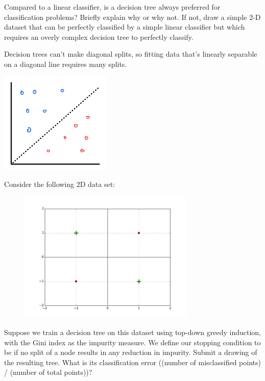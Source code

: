 \problem[4]
Compared to a linear classifier, is a decision tree always preferred for classification problems? Briefly explain why or why not. If not, draw a simple 2-D dataset that can be perfectly classified by a simple linear classifier but which requires an overly complex decision tree to perfectly classify.

\begin{solution}
    Decision trees can't make diagonal splits, so fitting data that's linearly separable on a diagonal line requires many splits.

    \includegraphics[width=0.4\textwidth]{images/1b.png}
\end{solution}

\problem[15]
Consider the following 2D data set:
\begin{figure}[H]
    \begin{center}
    \includegraphics[width=3.3in]{plots/3C.png}
    \end{center}
    \end{figure}

\subproblem[5] Suppose we train a decision tree on this dataset using top-down greedy induction, with the Gini index as
the impurity measure. We define our stopping condition to be if no split of a node
results in any reduction in impurity. Submit a drawing of the resulting tree.  What is its classification error ((number of misclassified points) / (number of total points))?

